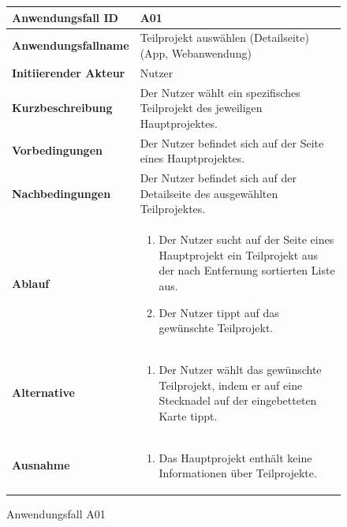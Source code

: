 \begin{figure}[h]
	\centering
	\begin{tabularx}{\textwidth}{ X | X }
		\textbf{Anwendungsfall ID} & A01 \\ \hline
		\textbf{Anwendungsfallname} & Teilprojekt auswählen (Detailseite) (App, Webanwendung) \\ \hline
		\textbf{Initiierender Akteur} & Nutzer \\ \hline
		\textbf{Kurzbeschreibung} & Der Nutzer wählt ein spezifisches Teilprojekt des jeweiligen Hauptprojektes.  \\ \hline
		\textbf{Vorbedingungen} & Der Nutzer befindet sich auf der Seite eines Hauptprojektes.  \\ \hline
		\textbf{Nachbedingungen} & Der Nutzer befindet sich auf der Detailseite des ausgewählten Teilprojektes.  \\ \hline
		\textbf{Ablauf} &
			\begin{enumerate}
				\item Der Nutzer sucht auf der Seite eines Hauptprojekt ein Teilprojekt aus der nach Entfernung sortierten Liste aus.
				\item Der Nutzer tippt auf das gewünschte Teilprojekt.
			\end{enumerate} \\ \hline
		\textbf{Alternative} &
				\begin{enumerate}
					\item  Der Nutzer wählt das gewünschte Teilprojekt, indem er auf eine Stecknadel auf der eingebetteten Karte tippt.
				\end{enumerate}  \\ \hline
		\textbf{Ausnahme} &
				\begin{enumerate}
					\item Das Hauptprojekt enthält keine Informationen über Teilprojekte.
				\end{enumerate}  \\ \hline
	\end{tabularx}
	\caption{Anwendungsfall A01}
	\label{fig:anwendungsfall-app-tabelle-xx-1}
\end{figure}

